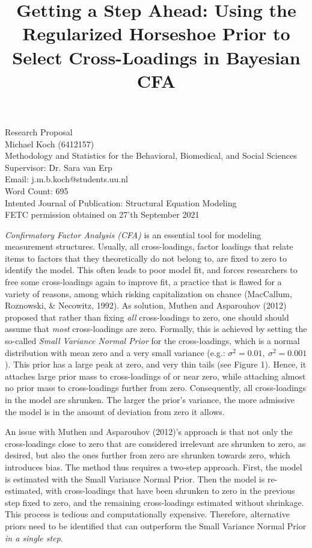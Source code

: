 \documentclass[
  english,
  man]{apa6}
\title{Getting a Step Ahead: Using the Regularized Horseshoe Prior to Select Cross-Loadings in Bayesian CFA}
\author{\phantom{0}}
\date{}
\affiliation{\phantom{0}}
\begin{document}
\maketitle

\vfill
Research Proposal \\
Michael Koch (6412157)\\
Methodology and Statistics for the Behavioral, Biomedical, and Social Sciences \\
Supervisor: Dr. Sara van Erp \\ 
Email: j.m.b.koch@students.uu.nl \\
Word Count: 695 \\
Intented Journal of Publication: Structural Equation Modeling \\
FETC permission obtained on 27'th September 2021

\setcounter{page}{0}
\thispagestyle{empty}
\pagestyle{plain}

\clearpage

\emph{Confirmatory Factor Analysis (CFA)} is an essential tool for modeling
measurement structures. Usually, all cross-loadings, factor
loadings that relate items to factors that they theoretically do not belong to, are fixed to zero to identify the model. This often leads to poor model fit,
and forces researchers to free some cross-loadings again
to improve fit, a practice that is flawed for a variety of reasons,
among which risking capitalization on chance
(MacCallum, Roznowski, \& Necowitz, 1992). As solution,
Muthen and Asparouhov (2012) proposed that rather than fixing \emph{all}
cross-loadings to zero, one should should assume that \emph{most}
cross-loadings are zero. Formally, this is achieved by setting the
so-called \emph{Small Variance Normal Prior} for the cross-loadings, which is a
normal distribution with mean zero and a very small variance (e.g.:
\(\sigma^2 = 0.01, \  \sigma^2 = 0.001\)). This prior has a large peak at zero, and very thin tails (see Figure 1). Hence, it attaches large prior mass to cross-loadings of or near zero, while attaching almost no prior mass to cross-loadings further from zero. Consequently, all cross-loadings in the model are
shrunken. The larger the prior's variance, the more
admissive the model is in the amount of deviation from zero it allows.

An issue with Muthen and Asparouhov (2012)'s approach is that not only the cross-loadings
close to zero that are considered irrelevant are shrunken to zero, as
desired, but also the ones further from zero are shrunken
towards zero, which introduces bias. The method thus requires a two-step
approach. First, the model is estimated with the Small Variance Normal Prior. Then the model
is re-estimated, with cross-loadings that have been shrunken to zero in
the previous step fixed to zero, and the remaining cross-loadings
estimated without shrinkage. This process is tedious and computationally expensive. Therefore, alternative priors need
to be identified that can outperform the Small Variance Normal Prior \emph{in a single step}.
\end{document}
